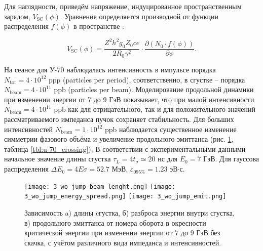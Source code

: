 \noindent Для наглядности, приведём напряжение, индуцированное про\-стран\-стве\-нным зарядом, $V_{\mathrm{SC}}(\phi)$. Уравнение определяется производной от функции распределения $f(\phi)$ в пространстве \cite{weilee:sc}:

\begin{equation}
V_{\text{SC}}\left(\phi\right)=\frac{Z^2h^2g_0Z_0ce}{2R_0\gamma^2}\cdot\frac{\partial\left(N_0\cdot f\left(\phi\right)\right)}{\partial\phi}.
\label{eq:V_sc}
\end{equation}

\par На сеансе для У-70 наблюдалась интенсивность в импульсе порядка $N_{\textrm{tot}}=4\cdot{10}^{12}$ ppp (particles per period), соответственно, в сгустке – порядка $N_{\textrm{beam}}=4\cdot{10}^{11}$ ppb (particles per beam). Моделирование продольной динамики при изменении энергии от 7 до 9 ГэВ показывает, что при малой интенсивности $N_{\textrm{beam}}=4\cdot{10}^{11}$ ppb как для отрицательного, так и для положительного значений рассматриваемого импеданса пучок сохраняет стабильность. Для больших интенсивностей $N_{\textrm{beam}}=1\cdot{10}^{12}$ ppb наблюдается существенное изменение симметрии фазового объёма и увеличение продольного эмиттанса (рис. \ref{fig:3_wo_jump}, таблица \ref{tbl:u-70_crossing}). В соответствии с экспериментальными данными начальное значение длины сгустка $\tau_L=4t_\sigma\simeq20$ нс для $E_0=7$ ГэВ. Для гауссова распределения $\Delta E_{0} = 4E \sigma = 52.7$ МэВ, $\varepsilon_{0 95\%}=1.23$ эВ$\cdot$с.
	
\begin{figure} [h!]
   \texttt{[image: 3\_wo\_jump\_beam\_lenght.png]}
   \texttt{[image: 3\_wo\_jump\_energy\_spread.png]}
   \texttt{[image: 3\_wo\_jump\_emit.png]}
   \caption{Зависимость a) длины cгустка, б) разброса энергии внутри сгустка, в) продольного эмиттанса от номера оборота в окресности критической энергии при изменении энергии от $7$ до $9$ ГэВ без скачка, с учётом различного вида импеданса и интенсивностей.}
   \label{fig:3_wo_jump}
\end{figure}

